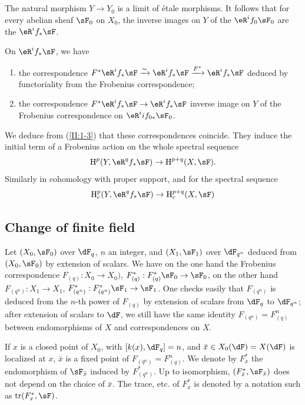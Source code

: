 \subsection{}\label{II:1-4}

The natural morphism $Y\to Y_0$ is a limit of \'etale morphisms. It
follows that for every abelian sheaf $\sF_0$ on $X_0$, the inverse
images on $Y$ of the $\eR^if_0\sF_0$ are the $\eR^if_*\sF$.

On $\eR^if_*\sF$, we have
\begin{enumerate}[\indent a)]
  \item the correspondence
    $F^*\eR^i f_*\sF \iso \eR^i f_*\sF \xrightarrow{F^*} \eR^if_*\sF$ deduced
    by functoriality from the Frobenius correspondence;
  \item the correspondence $F^*\eR^if_*\sF\to\eR^if_*\sF$ inverse image on
    $Y$ of the Frobenius correspondence on $\eR^ii f_{0*}\sF_0$.
\end{enumerate}

We deduce from (\ref{II:1-3}) that these correspondences coincide. They
induce the initial term of a Frobenius action on the whole spectral
sequence
\[
  \h^p(Y,\eR^q f_*\sF) \rightarrow \h^{p+q}(X,\sF) \text{.}
\]
Similarly in cohomology with proper support, and for the spectral sequence
\[
  \h_c^p(Y,\eR^q f_* \sF) \rightarrow \h_c^{p+q}(X,\sF)
\]




\subsection{Change of finite field}\label{II:1-5}

Let $(X_0,\sF_0)$ over $\dF_q$, $n$ an integer, and $(X_1,\sF_1)$ over
$\dF_{q^n}$ deduced from $(X_0,\sF_0)$ by extension of scalars. We have
on the one hand the Frobenius correspondence $F_{(q)}:X_0\to X_0)$,
$F_{(q)}^*:F_{(q)}^*\sF_0\to \sF_0$, on the other hand
$F_{(q^n)}:X_1\to X_1$, $F_{(q^n)}^*:F_{(q^n)}^*\sF_1\to\sF_1$. One checks
easily that $F_{(q^n)}$ is deduced from the $n$-th power of $F_{(q)}$
by extension of scalars from $\dF_q$ to $\dF_{q^n}$; after extension of
scalars to $\dF$, we still have the same identity $F_{(q^n)}=F_{(q)}^n$
between endomorphisms of $X$ and correspondences on $X$.

If $x$ is a closed point of $X_0$, with $[k(x),\dF_q]=n$, and
$\bar x\in X_0(\dF) = X(\dF)$ is localized at $x$, $\bar x$ is a
fixed point of $F_{(q^n)}=F_{(q)}^n$. We denote by $F_x^*$ the endomorphism of
$\sF_{\bar x}$ induced by $F_{(q^n)}^*$. Up to isomorphism,
$(F_{\bar x}^*,\sF_{\bar x})$ does not depend on the choice of $\bar x$. The trace,
etc. of $F_x^*$ is denoted by a notation such as
$\tr(F_x^*,\sF)$.




